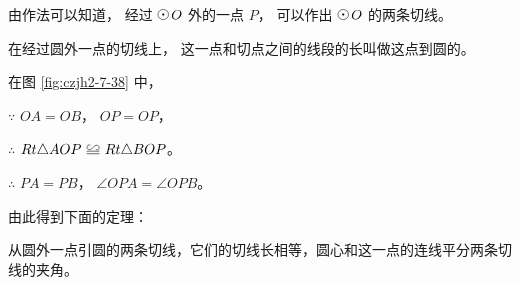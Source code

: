 由作法可以知道， 经过 $\yuan\,O$ 外的一点 $P$， 可以作出 $\yuan\,O$ 的两条切线。

在经过圆外一点的切线上， 这一点和切点之间的线段的长叫做这点到圆的。

在图 \ref{fig:czjh2-7-38} 中，

$\because$ \quad $OA = OB$， $OP = OP$，

$\therefore$ \quad $Rt \triangle AOP \quandeng Rt \triangle BOP$。

$\therefore$ \quad $PA = PB$， $\angle OPA = \angle OPB$。

由此得到下面的定理：

\begin{dingli}[切线长定理]
    从圆外一点引圆的两条切线，它们的切线长相等，圆心和这一点的连线平分两条切线的夹角。
\end{dingli}



\begin{lianxi}

\begin{xiaoxiaotis}



\end{xiaoxiaotis}


\begin{xiaoxiaotis}


\end{xiaoxiaotis}


\end{lianxi}


